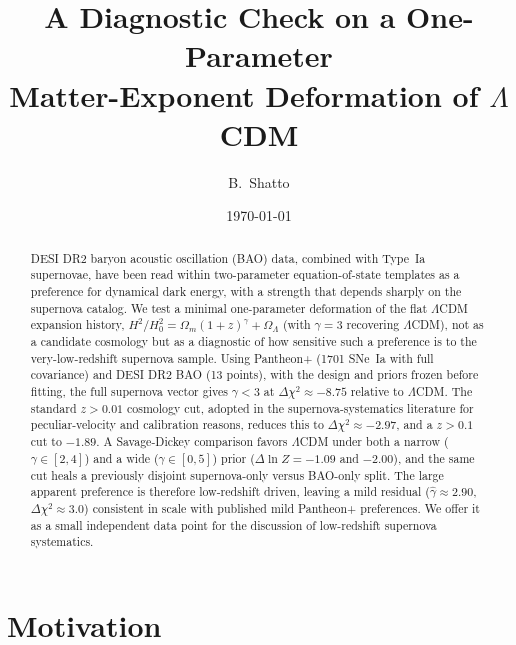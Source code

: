 \documentclass[
  aps,
  prd,
  reprint,           %
  nofootinbib,
  longbibliography
]{revtex4-2}
\begin{document}
\title{A Diagnostic Check on a One-Parameter\\
       Matter-Exponent Deformation of $\Lambda$CDM}

\author{B.~Shatto}

\date{\today}

\begin{abstract}
DESI DR2 baryon acoustic oscillation (BAO) data, combined with Type~Ia
supernovae, have been read within two-parameter equation-of-state
templates as a preference for dynamical dark energy, with a strength that
depends sharply on the supernova catalog. We test a minimal one-parameter
deformation of the flat $\Lambda$CDM expansion history,
$H^2/H_0^2 = \Omega_m (1+z)^{\gamma} + \Omega_\Lambda$ (with $\gamma = 3$
recovering $\Lambda$CDM), not as a candidate cosmology but as a diagnostic
of how sensitive such a preference is to the very-low-redshift supernova
sample. Using Pantheon+ (1701 SNe~Ia with full covariance) and DESI DR2
BAO (13 points), with the design and priors frozen before fitting, the
full supernova vector gives $\gamma < 3$ at $\Delta\chi^2 \approx -8.75$
relative to $\Lambda$CDM. The standard $z > 0.01$ cosmology cut, adopted
in the supernova-systematics literature for peculiar-velocity and
calibration reasons, reduces this to $\Delta\chi^2 \approx -2.97$, and a
$z > 0.1$ cut to $-1.89$. A Savage-Dickey comparison favors $\Lambda$CDM
under both a narrow ($\gamma \in [2,4]$) and a wide ($\gamma \in [0,5]$)
prior ($\Delta\ln Z = -1.09$ and $-2.00$), and the same cut heals a
previously disjoint supernova-only versus BAO-only split. The large
apparent preference is therefore low-redshift driven, leaving a mild
residual ($\hat\gamma \approx 2.90$, $\Delta\chi^2 \approx 3.0$)
consistent in scale with published mild Pantheon+ preferences. We offer it
as a small independent data point for the discussion of low-redshift
supernova systematics.
\end{abstract}

\maketitle

\section{Motivation}\label{sec:intro}
\end{document}
